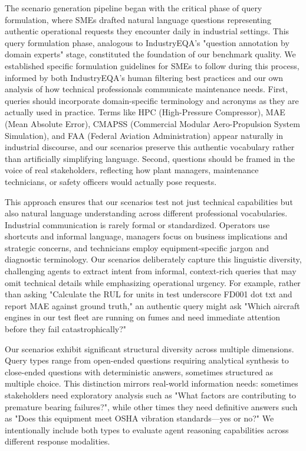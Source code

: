 \documentclass[conference]{IEEEtran}
\begin{document}
The scenario generation pipeline began with the critical phase of query formulation, where SMEs drafted natural language questions representing authentic operational requests they encounter daily in industrial settings. This query formulation phase, analogous to IndustryEQA's "question annotation by domain experts" stage, constituted the foundation of our benchmark quality. We established specific formulation guidelines for SMEs to follow during this process, informed by both IndustryEQA's human filtering best practices and our own analysis of how technical professionals communicate maintenance needs. First, queries should incorporate domain-specific terminology and acronyms as they are actually used in practice. Terms like HPC (High-Pressure Compressor), MAE (Mean Absolute Error), CMAPSS (Commercial Modular Aero-Propulsion System Simulation), and FAA (Federal Aviation Administration) appear naturally in industrial discourse, and our scenarios preserve this authentic vocabulary rather than artificially simplifying language. Second, questions should be framed in the voice of real stakeholders, reflecting how plant managers, maintenance technicians, or safety officers would actually pose requests.

This approach ensures that our scenarios test not just technical capabilities but also natural language understanding across different professional vocabularies. Industrial communication is rarely formal or standardized. Operators use shortcuts and informal language, managers focus on business implications and strategic concerns, and technicians employ equipment-specific jargon and diagnostic terminology. Our scenarios deliberately capture this linguistic diversity, challenging agents to extract intent from informal, context-rich queries that may omit technical details while emphasizing operational urgency. For example, rather than asking "Calculate the RUL for units in test underscore FD001 dot txt and report MAE against ground truth," an authentic query might ask "Which aircraft engines in our test fleet are running on fumes and need immediate attention before they fail catastrophically?"

Our scenarios exhibit significant structural diversity across multiple dimensions. Query types range from open-ended questions requiring analytical synthesis to close-ended questions with deterministic answers, sometimes structured as multiple choice. This distinction mirrors real-world information needs: sometimes stakeholders need exploratory analysis such as "What factors are contributing to premature bearing failures?", while other times they need definitive answers such as "Does this equipment meet OSHA vibration standards—yes or no?" We intentionally include both types to evaluate agent reasoning capabilities across different response modalities.
\end{document}
